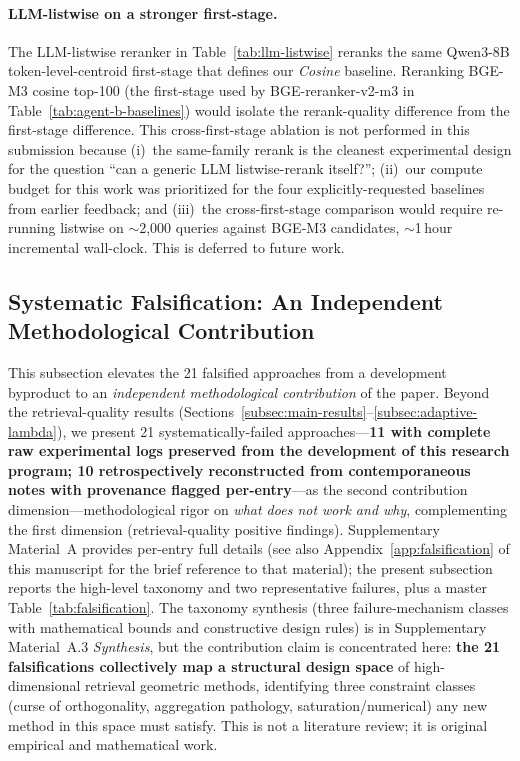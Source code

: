 \documentclass[review,1p]{elsarticle}
\begin{document}
\paragraph{LLM-listwise on a stronger first-stage.} The LLM-listwise reranker in Table~\ref{tab:llm-listwise} reranks the same Qwen3-8B token-level-centroid first-stage that defines our \emph{Cosine} baseline. Reranking BGE-M3 cosine top-100 (the first-stage used by BGE-reranker-v2-m3 in Table~\ref{tab:agent-b-baselines}) would isolate the rerank-quality difference from the first-stage difference. This cross-first-stage ablation is not performed in this submission because (i)~the same-family rerank is the cleanest experimental design for the question ``can a generic LLM listwise-rerank itself?''; (ii)~our compute budget for this work was prioritized for the four explicitly-requested baselines from earlier feedback; and (iii)~the cross-first-stage comparison would require re-running listwise on $\sim$2,000 queries against BGE-M3 candidates, $\sim$1\,hour incremental wall-clock. This is deferred to future work.

\subsection{Systematic Falsification: An Independent Methodological Contribution}
\label{subsec:falsification}

This subsection elevates the 21 falsified approaches from a development byproduct to an \emph{independent methodological contribution} of the paper. Beyond the retrieval-quality results (Sections~\ref{subsec:main-results}--\ref{subsec:adaptive-lambda}), we present 21 systematically-failed approaches---\textbf{11 with complete raw experimental logs preserved from the development of this research program; 10 retrospectively reconstructed from contemporaneous notes with provenance flagged per-entry}---as the second contribution dimension---methodological rigor on \emph{what does not work and why}, complementing the first dimension (retrieval-quality positive findings). Supplementary Material~A provides per-entry full details (see also Appendix~\ref{app:falsification} of this manuscript for the brief reference to that material); the present subsection reports the high-level taxonomy and two representative failures, plus a master Table~\ref{tab:falsification}. The taxonomy synthesis (three failure-mechanism classes with mathematical bounds and constructive design rules) is in Supplementary Material~A.3 \emph{Synthesis}, but the contribution claim is concentrated here: \textbf{the 21 falsifications collectively map a structural design space} of high-dimensional retrieval geometric methods, identifying three constraint classes (curse of orthogonality, aggregation pathology, saturation/numerical) any new method in this space must satisfy. This is not a literature review; it is original empirical and mathematical work.
\end{document}
